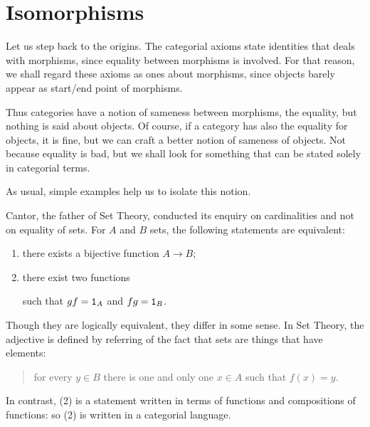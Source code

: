 
\section{Isomorphisms}


Let us step back to the origins. The categorial axioms state identities that deals with morphisms, since equality between morphisms is involved. For that reason, we shall regard these axioms as ones about morphisms, since objects barely appear as start/end point of morphisms.

Thus categories have a notion of sameness between morphisms, the equality, but nothing is said about objects. Of course, if a category has also the equality for objects, it is fine, but we can craft a better notion of sameness of objects. Not because equality is bad, but we shall look for something that can be stated solely in categorial terms.

As usual, simple examples help us to isolate this notion.

\begin{example}
Cantor, the father of Set Theory, conducted its enquiry on cardinalities and not on equality of sets. For \(A\) and \(B\) sets, the following statements are equivalent:
\begin{enumerate}
\item there exists a bijective function \(A \to B\);
\item there exist two functions
such that \(g f = \mathtt 1_A\) and \(fg = \mathtt 1_B\).
\end{enumerate}
Though they are logically equivalent, they differ in some sense. In Set Theory, the adjective  is defined by referring of the fact that sets are things that have elements:
\begin{quotation}
for every \(y \in B\) there is one and only one \(x \in A\) such that \(f(x) = y\).
\end{quotation}
In contrast, (2) is a statement written in terms of functions and compositions of functions: so (2) is written in a categorial language.
\end{example}

